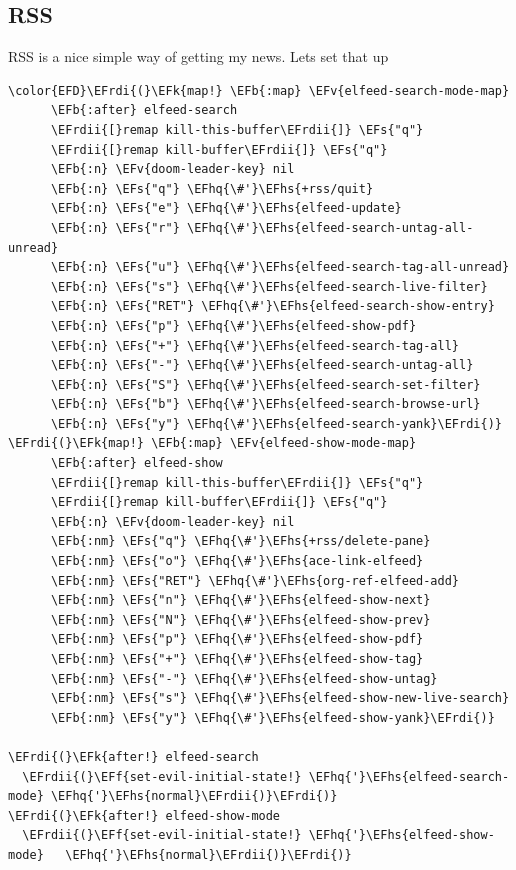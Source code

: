 \documentclass{scrartcl}
\newcommand{\EFk}[1]{\textcolor{EFk}{#1}} %
\newcommand{\EFs}[1]{\textcolor{EFs}{#1}} %
\newcommand{\EFb}[1]{\textcolor{EFb}{#1}} %
\newcommand{\EFv}[1]{\textcolor{EFv}{#1}} %
\newcommand{\EFf}[1]{\textcolor{EFf}{#1}} %
\newcommand{\EFhq}[1]{#1} %
\newcommand{\EFhs}[1]{#1} %
\newcommand{\EFrdi}[1]{#1} %
\newcommand{\EFrdii}[1]{#1} %
\begin{document}
\subsection{RSS}
\label{sec:org51a2eb6}
RSS is a nice simple way of getting my news. Lets set that up
\begin{Code}
\begin{Verbatim}[]
\color{EFD}\EFrdi{(}\EFk{map!} \EFb{:map} \EFv{elfeed-search-mode-map}
      \EFb{:after} elfeed-search
      \EFrdii{[}remap kill-this-buffer\EFrdii{]} \EFs{"q"}
      \EFrdii{[}remap kill-buffer\EFrdii{]} \EFs{"q"}
      \EFb{:n} \EFv{doom-leader-key} nil
      \EFb{:n} \EFs{"q"} \EFhq{\#'}\EFhs{+rss/quit}
      \EFb{:n} \EFs{"e"} \EFhq{\#'}\EFhs{elfeed-update}
      \EFb{:n} \EFs{"r"} \EFhq{\#'}\EFhs{elfeed-search-untag-all-unread}
      \EFb{:n} \EFs{"u"} \EFhq{\#'}\EFhs{elfeed-search-tag-all-unread}
      \EFb{:n} \EFs{"s"} \EFhq{\#'}\EFhs{elfeed-search-live-filter}
      \EFb{:n} \EFs{"RET"} \EFhq{\#'}\EFhs{elfeed-search-show-entry}
      \EFb{:n} \EFs{"p"} \EFhq{\#'}\EFhs{elfeed-show-pdf}
      \EFb{:n} \EFs{"+"} \EFhq{\#'}\EFhs{elfeed-search-tag-all}
      \EFb{:n} \EFs{"-"} \EFhq{\#'}\EFhs{elfeed-search-untag-all}
      \EFb{:n} \EFs{"S"} \EFhq{\#'}\EFhs{elfeed-search-set-filter}
      \EFb{:n} \EFs{"b"} \EFhq{\#'}\EFhs{elfeed-search-browse-url}
      \EFb{:n} \EFs{"y"} \EFhq{\#'}\EFhs{elfeed-search-yank}\EFrdi{)}
\EFrdi{(}\EFk{map!} \EFb{:map} \EFv{elfeed-show-mode-map}
      \EFb{:after} elfeed-show
      \EFrdii{[}remap kill-this-buffer\EFrdii{]} \EFs{"q"}
      \EFrdii{[}remap kill-buffer\EFrdii{]} \EFs{"q"}
      \EFb{:n} \EFv{doom-leader-key} nil
      \EFb{:nm} \EFs{"q"} \EFhq{\#'}\EFhs{+rss/delete-pane}
      \EFb{:nm} \EFs{"o"} \EFhq{\#'}\EFhs{ace-link-elfeed}
      \EFb{:nm} \EFs{"RET"} \EFhq{\#'}\EFhs{org-ref-elfeed-add}
      \EFb{:nm} \EFs{"n"} \EFhq{\#'}\EFhs{elfeed-show-next}
      \EFb{:nm} \EFs{"N"} \EFhq{\#'}\EFhs{elfeed-show-prev}
      \EFb{:nm} \EFs{"p"} \EFhq{\#'}\EFhs{elfeed-show-pdf}
      \EFb{:nm} \EFs{"+"} \EFhq{\#'}\EFhs{elfeed-show-tag}
      \EFb{:nm} \EFs{"-"} \EFhq{\#'}\EFhs{elfeed-show-untag}
      \EFb{:nm} \EFs{"s"} \EFhq{\#'}\EFhs{elfeed-show-new-live-search}
      \EFb{:nm} \EFs{"y"} \EFhq{\#'}\EFhs{elfeed-show-yank}\EFrdi{)}

\EFrdi{(}\EFk{after!} elfeed-search
  \EFrdii{(}\EFf{set-evil-initial-state!} \EFhq{'}\EFhs{elfeed-search-mode} \EFhq{'}\EFhs{normal}\EFrdii{)}\EFrdi{)}
\EFrdi{(}\EFk{after!} elfeed-show-mode
  \EFrdii{(}\EFf{set-evil-initial-state!} \EFhq{'}\EFhs{elfeed-show-mode}   \EFhq{'}\EFhs{normal}\EFrdii{)}\EFrdi{)}


\end{Verbatim}
\end{Code}
\end{document}
